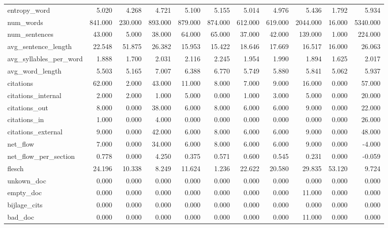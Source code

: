 \begin{tabular}{lrrrrrrrrrr}
\cline{1-11}
entropy\_word & 5.020 & 4.268 & 4.721 & 5.100 & 5.155 & 5.014 & 4.976 & 5.436 & 1.792 & 5.934 \\
\cline{1-11}
num\_words & 841.000 & 230.000 & 893.000 & 879.000 & 874.000 & 612.000 & 619.000 & 2044.000 & 16.000 & 5340.000 \\
\cline{1-11}
num\_sentences & 43.000 & 5.000 & 38.000 & 64.000 & 65.000 & 37.000 & 42.000 & 139.000 & 1.000 & 224.000 \\
\cline{1-11}
avg\_sentence\_length & 22.548 & 51.875 & 26.382 & 15.953 & 15.422 & 18.646 & 17.669 & 16.517 & 16.000 & 26.063 \\
\cline{1-11}
avg\_syllables\_per\_word & 1.888 & 1.700 & 2.031 & 2.116 & 2.245 & 1.954 & 1.990 & 1.894 & 1.625 & 2.017 \\
\cline{1-11}
avg\_word\_length & 5.503 & 5.165 & 7.007 & 6.388 & 6.770 & 5.749 & 5.880 & 5.841 & 5.062 & 5.937 \\
\cline{1-11}
citations & 62.000 & 2.000 & 43.000 & 11.000 & 8.000 & 7.000 & 9.000 & 16.000 & 0.000 & 57.000 \\
\cline{1-11}
citations\_internal & 2.000 & 2.000 & 1.000 & 5.000 & 0.000 & 1.000 & 3.000 & 5.000 & 0.000 & 20.000 \\
\cline{1-11}
citations\_out & 8.000 & 0.000 & 38.000 & 6.000 & 8.000 & 6.000 & 6.000 & 9.000 & 0.000 & 22.000 \\
\cline{1-11}
citations\_in & 1.000 & 0.000 & 4.000 & 0.000 & 0.000 & 0.000 & 0.000 & 0.000 & 0.000 & 26.000 \\
\cline{1-11}
citations\_external & 9.000 & 0.000 & 42.000 & 6.000 & 8.000 & 6.000 & 6.000 & 9.000 & 0.000 & 48.000 \\
\cline{1-11}
net\_flow & 7.000 & 0.000 & 34.000 & 6.000 & 8.000 & 6.000 & 6.000 & 9.000 & 0.000 & -4.000 \\
\cline{1-11}
net\_flow\_per\_section & 0.778 & 0.000 & 4.250 & 0.375 & 0.571 & 0.600 & 0.545 & 0.231 & 0.000 & -0.059 \\
\cline{1-11}
flesch & 24.196 & 10.338 & 8.249 & 11.624 & 1.236 & 22.622 & 20.580 & 29.835 & 53.120 & 9.724 \\
\cline{1-11}
unkown\_doc & 0.000 & 0.000 & 0.000 & 0.000 & 0.000 & 0.000 & 0.000 & 0.000 & 0.000 & 0.000 \\
\cline{1-11}
empty\_doc & 0.000 & 0.000 & 0.000 & 0.000 & 0.000 & 0.000 & 0.000 & 11.000 & 0.000 & 0.000 \\
\cline{1-11}
bijlage\_cits & 0.000 & 0.000 & 0.000 & 0.000 & 0.000 & 0.000 & 0.000 & 0.000 & 0.000 & 0.000 \\
\cline{1-11}
bad\_doc & 0.000 & 0.000 & 0.000 & 0.000 & 0.000 & 0.000 & 0.000 & 11.000 & 0.000 & 0.000 \\
\cline{1-11}
\bottomrule
\end{tabular}
